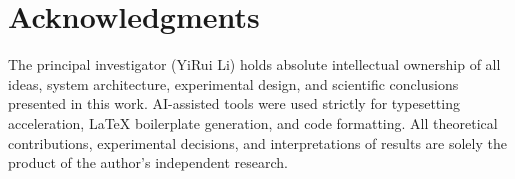 \documentclass[11pt,a4paper]{article}
\begin{document}
\section*{Acknowledgments}

The principal investigator (YiRui Li) holds absolute intellectual ownership of all ideas, system architecture, experimental design, and scientific conclusions presented in this work. AI-assisted tools were used strictly for typesetting acceleration, LaTeX boilerplate generation, and code formatting. All theoretical contributions, experimental decisions, and interpretations of results are solely the product of the author's independent research.


\end{document}
